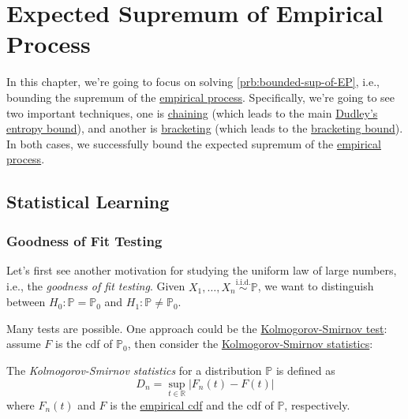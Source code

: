 \chapter{Expected Supremum of Empirical Process}
In this chapter, we're going to focus on solving \autoref{prb:bounded-sup-of-EP}, i.e., bounding the supremum of the \hyperref[def:EP]{empirical process}. Specifically, we're going to see two important techniques, one is \hyperref[note:chaining]{chaining} (which leads to the main \hyperref[thm:Dudley-entropy-bound]{Dudley's entropy bound}), and another is \hyperref[def:bracketing-number]{bracketing} (which leads to the \hyperref[thm:bracketing-bound]{bracketing bound}). In both cases, we successfully bound the expected supremum of the \hyperref[def:EP]{empirical process}.

\section{Statistical Learning}\label{sec:statistical-learning}
\subsection{Goodness of Fit Testing}
Let's first see another motivation for studying the uniform law of large numbers, i.e., the \emph{goodness of fit testing}. Given \(X_1, \dots , X_n \overset{\text{i.i.d.}}{\sim } \mathbb{P} \), we want to distinguish between \(H_0 \colon \mathbb{P} = \mathbb{P} _0\) and \(H_1\colon \mathbb{P} \neq \mathbb{P} _0\).

Many tests are possible. One approach could be the \href{https://en.wikipedia.org/wiki/Kolmogorov-Smirnov_test}{Kolmogorov-Smirnov test}: assume \(F\) is the cdf of \(\mathbb{P} _0\), then consider the \hyperref[def:Kolmogorov-Smirnov-statistics]{Kolmogorov-Smirnov statistics}:

\begin{definition}\label{def:Kolmogorov-Smirnov-statistics}
	The \emph{Kolmogorov-Smirnov statistics} for a distribution \(\mathbb{P} \) is defined as
	\[
		D_n = \sup _{t\in \mathbb{R} } \vert F_n(t) - F(t) \vert
	\]
	where \(F_n(t)\) and \(F\) is the \hyperref[def:empirical-cdf]{empirical cdf} and the cdf of \(\mathbb{P} \), respectively.
\end{definition}

